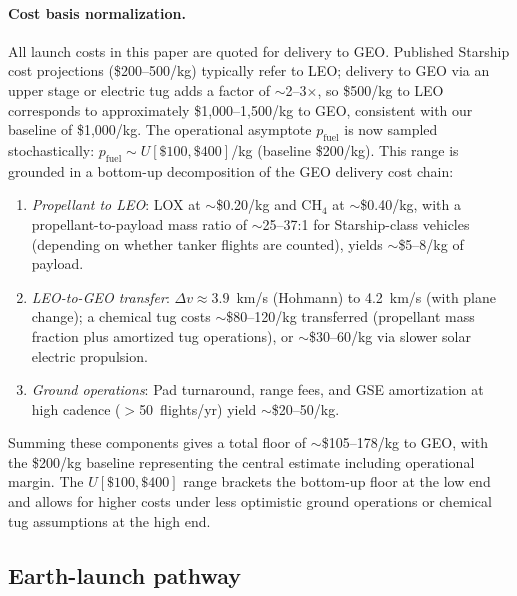 \documentclass[preprint,12pt]{elsarticle}
\begin{document}
\paragraph{Cost basis normalization.} All launch costs in this paper are quoted for delivery to GEO. Published Starship cost projections (\$200--500/kg) typically refer to LEO; delivery to GEO via an upper stage or electric tug adds a factor of $\sim$2--3$\times$, so \$500/kg to LEO corresponds to approximately \$1,000--1,500/kg to GEO, consistent with our baseline of \$1,000/kg. The operational asymptote $p_{\mathrm{fuel}}$ is now sampled stochastically: $p_{\mathrm{fuel}} \sim U[\$100, \$400]$/kg (baseline \$200/kg). This range is grounded in a bottom-up decomposition of the GEO delivery cost chain:
\begin{enumerate}
  \item \emph{Propellant to LEO}: LOX at $\sim$\$0.20/kg and CH$_4$ at $\sim$\$0.40/kg, with a propellant-to-payload mass ratio of $\sim$25--37:1 for Starship-class vehicles (depending on whether tanker flights are counted), yields $\sim$\$5--8/kg of payload.
  \item \emph{LEO-to-GEO transfer}: $\Delta v \approx 3.9$~km/s (Hohmann) to 4.2~km/s (with plane change); a chemical tug costs $\sim$\$80--120/kg transferred (propellant mass fraction plus amortized tug operations), or $\sim$\$30--60/kg via slower solar electric propulsion.
  \item \emph{Ground operations}: Pad turnaround, range fees, and GSE amortization at high cadence ($>$50~flights/yr) yield $\sim$\$20--50/kg.
\end{enumerate}
Summing these components gives a total floor of $\sim$\$105--178/kg to GEO, with the \$200/kg baseline representing the central estimate including operational margin. The $U[\$100, \$400]$ range brackets the bottom-up floor at the low end and allows for higher costs under less optimistic ground operations or chemical tug assumptions at the high end.

\subsection{Earth-launch pathway}
\end{document}

